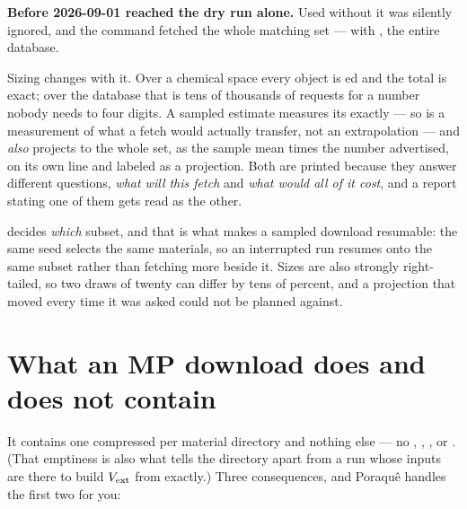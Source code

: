 \begin{pwarn}
\textbf{Before 2026-09-01  reached the dry run alone.} Used
without  it was silently ignored, and the command fetched the
whole matching set --- with , the entire database.
\end{pwarn}

Sizing changes with it. Over a chemical space every object is ed and
the total is exact; over the database that is tens of thousands of requests for
a number nobody needs to four digits. A sampled estimate measures its 
exactly --- so  is a measurement of what a fetch would
actually transfer, not an extrapolation --- and \emph{also} projects to the
whole set, as the sample mean times the number advertised, on its own line and
labeled as a projection. Both are printed because they answer different
questions, \emph{what will this fetch} and \emph{what would all of it cost},
and a report stating one of them gets read as the other.

 decides \emph{which} subset, and that is what makes a sampled
download resumable: the same seed selects the same materials, so an interrupted
run resumes onto the same subset rather than fetching  more beside it.
Sizes are also strongly right-tailed, so two draws of twenty can differ by tens
of percent, and a projection that moved every time it was asked could not be
planned against.

\section{What an MP download does and does not contain}

It contains one compressed  per material directory and nothing
else --- no , , ,  or
. (That emptiness is also what tells the directory apart from a
run whose inputs are there to build $V_{\mathrm{ext}}$ from exactly.)
Three consequences, and Poraqu\^e handles the first two for you:

